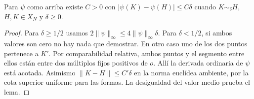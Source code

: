 \begin{lema}
\label{lem:ahr-bump}
Para $\psi$ como arriba existe $C>0$ con $|\psi(K)-\psi(H)|\le C\delta$ cuando $K\sim_\delta H$, $H,K\in X_N$ y $\delta\ge0$.
\end{lema}
\begin{proof}
Para $\delta\ge1/2$ usamos $2\|\psi\|_\infty\le4\|\psi\|_\infty\delta$. Para $\delta<1/2$, si ambos valores son cero no hay nada que demostrar. En otro caso uno de los dos puntos pertenece a $K'$. Por comparabilidad relativa, ambos puntos y el segmento entre ellos están entre dos múltiplos fijos positivos de $o$. Allí la derivada ordinaria de $\psi$ está acotada. Asimismo $\|K-H\|\le C'\delta$ en la norma euclídea ambiente, por la cota superior uniforme para las formas. La desigualdad del valor medio prueba el lema.
\end{proof}

